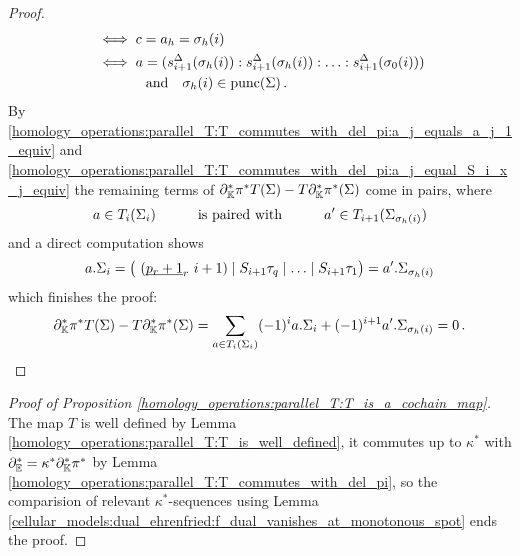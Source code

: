 \begin{proof}
\begin{align}
            &\iff c = a_h = \sigma_h(i) \\
            &\iff a = (s_{i+1}^\Delta(\sigma_h(i)) : s_{i+1}^\Delta(\sigma_h(i)) : \ldots : s_{i+1}^\Delta(\sigma_0(i))) \notag \\
            \label{homology_operations:parallel_T:T_commutes_with_del_pi:a_j_equal_S_i_x_j_equiv}
            &\phantom{{}\iff} \mspc{and}{10} \sigma_h(i) \in \punc(\Sigma) \,.
    \end{align}
    By \eqref{homology_operations:parallel_T:T_commutes_with_del_pi:a_j_equals_a_j_1_equiv} and \eqref{homology_operations:parallel_T:T_commutes_with_del_pi:a_j_equal_S_i_x_j_equiv}
    the remaining terms of $\del_\KK^\ast\pi^\ast T(\Sigma) - T\del_\KK^\ast\pi^\ast(\Sigma)$ come in pairs, where
    \[
        a \in T_i(\Sigma_i) \mspc{is paired with}{30} a' \in T_{i+1}(\Sigma_{\sigma_h(i)})
    \]
    and a direct computation shows
    \[
        a.\Sigma_i = \big(\ (\ul{p_r+1}_r\ i+1) \mid S_{i+1}\tau_q \mid \ldots \mid S_{i+1}\tau_1 \big) = a'.\Sigma_{\sigma_h(i)}
    \]
    which finishes the proof:
    \[
        \del_\KK^\ast\pi^\ast T(\Sigma) - T\del_\KK^\ast\pi^\ast(\Sigma)
            = \sum_{a \in T_i(\Sigma_i)} (-1)^i a.\Sigma_i + (-1)^{i+1} a'.\Sigma_{\sigma_h(i)} = 0 \,.
    \]
\end{proof}

\begin{proof}[Proof of Proposition \ref{homology_operations:parallel_T:T_is_a_cochain_map}]
    The map $T$ is well defined by Lemma \ref{homology_operations:parallel_T:T_is_well_defined},
    it commutes up to $\kappa^\ast$ with $\del_\E^\ast = \kappa^\ast \del_\KK^\ast \pi^\ast$ by Lemma \ref{homology_operations:parallel_T:T_commutes_with_del_pi},
    so the comparision of relevant $\kappa^\ast$-sequences using Lemma \ref{cellular_models:dual_ehrenfried:f_dual_vanishes_at_monotonous_spot} ends the proof.
\end{proof}
